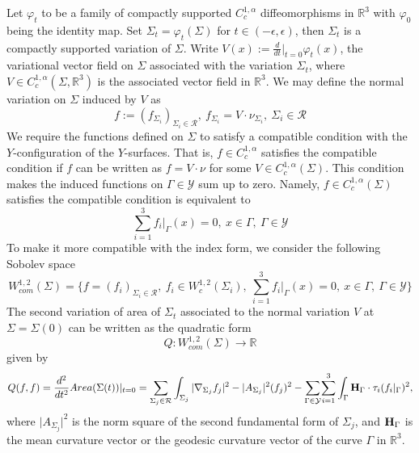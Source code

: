 \documentclass[11pt]{amsart}
\numberwithin{equation}{section}
\theoremstyle{theorem}
\theoremstyle{definition}
\numberwithin{equation}{section}
\begin{document}
Let $\varphi_t$ to be a family of compactly supported $C_c^{1,\alpha}$ diffeomorphisms in $\mathbb{R}^3$ with $\varphi_0$ being the identity map. Set $\Sigma_t=\varphi_t(\Sigma)$ for $t\in (-\epsilon,\epsilon)$, then $\Sigma_t$ is a compactly supported variation of $\Sigma$. Write $V(x):=\frac{d}{dt}\vert_{t=0}\varphi_t(x)$, the variational vector field on $\Sigma$ associated with the variation $\Sigma_t$, where $V\in C_c^{1,\alpha}(\Sigma,\mathbb{R}^3)$ is the associated vector field in $\mathbb{R}^3$. We may define the normal variation on $\Sigma$ induced by $V$ as 
$$
f:=(f_{\Sigma_i})_{\Sigma_i\in \mathcal{R}},\ f_{\Sigma_i}=V\cdot \nu_{\Sigma_i},\ \Sigma_i \in \mathcal{R}
$$
We require the functions defined on $\Sigma$ to satisfy a compatible condition with the $Y$-configuration of the $Y$-surfaces. That is, $f\in C_c^{1,\alpha}$ satisfies the compatible condition if $f$ can be written as $f=V\cdot \nu$ for some $V\in C_c^{1,\alpha}(\Sigma)$. This condition makes the induced functions on $\Gamma \in \mathcal{Y}$ sum up to zero. Namely, $f\in C_c^{1,\alpha}(\Sigma)$ satisfies the compatible condition is equivalent to 
$$
\underset{i=1}{\overset{3}{\sum}}f_i\vert_{\Gamma}(x)=0,\ x\in \Gamma,\  \Gamma\in \mathcal{Y}
$$
To make it more compatible with the index form, we consider the following Sobolev space
$$
W_{com}^{1,2}(\Sigma)=\{ f=(f_{i})_{\Sigma_i\in \mathcal{R}},\ f_i\in W_c^{1,2}(\Sigma_i),\ \underset{i=1}{\overset{3}{\sum}}f_i\vert_{\Gamma}(x)=0,\ x\in \Gamma,\  \Gamma\in \mathcal{Y}\} 
$$
The second variation of area of $\Sigma_t$ associated to the normal variation $V$ at $\Sigma =\Sigma(0)$ can be  written as the quadratic form
\begin{equation}
    \nonumber
    Q : W_{com}^{1,2} (\Sigma) \rightarrow \mathbb{R} 
\end{equation}
given by 
\begin{equation} \label{eqn: 2nd variation fromula}
\begin{split}
   Q(f , f) = \frac{d^2}{dt^2} Area (\Sigma (t))\vert_{t=0} =  \underset{\Sigma_j\in \mathcal{R}}{\overset{}{\sum}}  \int_{\Sigma_j} \vert \nabla_{\Sigma_j} f_j \vert^2 - \vert A_{\Sigma_j} \vert^2 (f_j )^2  
     - \underset{\Gamma\in \mathcal{Y}}{\overset{}{\sum}}\underset{i=1}{\overset{3}{\sum}} \int_{\Gamma }    \bold{H}_{\Gamma} \cdot \tau_i (f_i \vert_{\Gamma} )^2 ,
   \end{split}
\end{equation}
where $\vert A_{\Sigma_j} \vert^2$ is the norm square of the second fundamental form of $\Sigma_j$, and $\bold{H}_{\Gamma}$ is the mean curvature vector or the geodesic curvature vector of the curve $\Gamma$ in $\mathbb{R}^3$. 
\medskip
\end{document}
